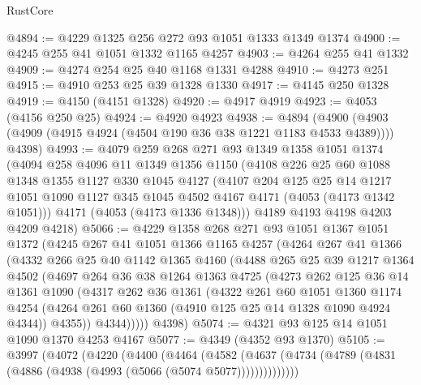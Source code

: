 \begin{lexlean}{RustCore}
\begin{coremodule}
@4894 := @4229 @1325 @256 @272 @93 @1051 @1333 @1349 @1374
@4900 := @4245 @255 @41 @1051 @1332 @1165 @4257
@4903 := @4264 @255 @41 @1332
@4909 := @4274 @254 @25 @40 @1168 @1331 @4288
@4910 := @4273 @251
@4915 := @4910 @253 @25 @39 @1328 @1330
@4917 := @4145 @250 @1328
@4919 := @4150 (@4151 @1328)
@4920 := @4917 @4919
@4923 := @4053 (@4156 @250 @25)
@4924 := @4920 @4923
@4938 := @4894
    (@4900 (@4903 (@4909 (@4915 @4924 (@4504 @190 @36 @38 @1221 @1183 @4533 @4389)))) @4398)
@4993 := @4079
    @259
    @268
    @271
    @93
    @1349
    @1358
    @1051
    @1374
    (@4094
      @258
      @4096
      @11
      @1349
      @1356
      @1150
      (@4108
        @226
        @25
        @60
        @1088
        @1348
        @1355
        @1127
        @330
        @1045
        @4127
        (@4107
          @204
          @125
          @25
          @14
          @1217
          @1051
          @1090
          @1127
          @345
          @1045
          @4502
          @4167
          @4171
          (@4053 (@4173 @1342 @1051)))
        @4171
        (@4053 (@4173 @1336 @1348)))
      @4189
      @4193
      @4198
      @4203
      @4209
      @4218)
@5066 := @4229
    @1358
    @268
    @271
    @93
    @1051
    @1367
    @1051
    @1372
    (@4245
      @267
      @41
      @1051
      @1366
      @1165
      @4257
      (@4264
        @267
        @41
        @1366
        (@4332
          @266
          @25
          @40
          @1142
          @1365
          @4160
          (@4488
            @265
            @25
            @39
            @1217
            @1364
            @4502
            (@4697
              @264
              @36
              @38
              @1264
              @1363
              @4725
              (@4273
                @262
                @125
                @36
                @14
                @1361
                @1090
                (@4317
                  @262
                  @36
                  @1361
                  (@4322
                    @261
                    @60
                    @1051
                    @1360
                    @1174
                    @4254
                    (@4264 @261 @60 @1360 (@4910 @125 @25 @14 @1328 @1090 @4924 @4344))
                    @4355))
                @4344)))))
      @4398)
@5074 := @4321 @93 @125 @14 @1051 @1090 @1370 @4253 @4167
@5077 := @4349 (@4352 @93 @1370)
@5105 := @3997
    (@4072
      (@4220
        (@4400
          (@4464
            (@4582
              (@4637 (@4734 (@4789 (@4831 (@4886 (@4938 (@4993 (@5066 (@5074 @5077))))))))))))))

\end{coremodule}
\end{lexlean}
